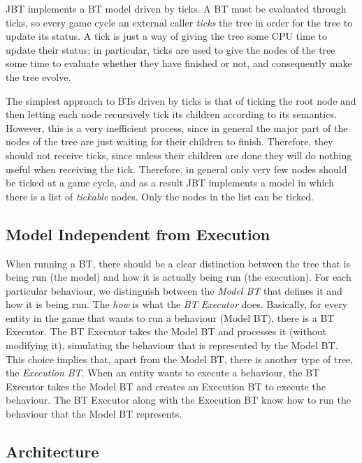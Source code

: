 \documentclass[a4paper]{article}
\begin{document}
JBT implements a BT model driven by ticks. A BT must be evaluated through ticks, so every game cycle an external caller \textit{ticks} the tree in order for the tree to update its status. A tick is just a way of giving the tree some CPU time to update their status; in particular, ticks are used to give the nodes of the tree some time to evaluate whether they have finished or not, and consequently make the tree evolve.

The simplest approach to BTs driven by ticks is that of ticking the root node and then letting each node recursively tick its children according to its semantics. However, this is a very inefficient process, since in general the major part of the nodes of the tree are just waiting for their children to finish. Therefore, they should not receive ticks, since unless their children are done they will do nothing useful when receiving the tick. Therefore, in general only very few nodes should be ticked at a game cycle, and as a result JBT implements a model in which there is a list of \textit{tickable} nodes. Only the nodes in the list can be ticked.

\subsection{Model Independent from Execution}\label{sec:ModelIndependentFromExecution}

When running a BT, there should be a clear distinction between the tree that is being run (the model) and how it is actually being run (the execution). For each particular behaviour, we distinguish between the \textit{Model BT} that defines it and how it is being run. The \textit{how} is what the \textit{BT Executor} does. Basically, for every entity in the game that wants to run a behaviour (Model BT), there is a BT Executor. The BT Executor takes the Model BT and processes it (without modifying it), simulating the behaviour that is represented by the Model BT. This choice implies that, apart from the Model BT, there is another type of tree, the \textit{Execution BT}. When an entity wants to execute a behaviour, the BT Executor takes the Model BT and creates an Execution BT to execute the behaviour. The BT Executor along with the Execution BT know how to run the behaviour that the Model BT represents.

\subsection{Architecture}\label{sec:Architecture}
\end{document}
